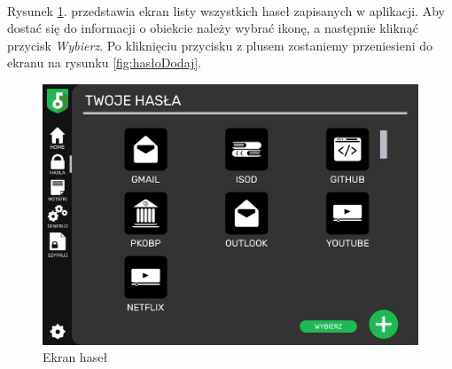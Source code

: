 \documentclass[a4paper]{article}
\begin{document}
\paragraph{}Rysunek \ref{fig:hasła}. przedstawia ekran listy wszystkich haseł zapisanych w aplikacji. Aby dostać się do informacji o obiekcie należy wybrać ikonę, a następnie kliknąć przycisk \textit{Wybierz}. Po kliknięciu przycisku z plusem zostaniemy przeniesieni do ekranu na rysunku \ref{fig:hasłoDodaj}.
\begin{figure}[H]
    \centering
    \includegraphics[width=1\textwidth]{img/ekran_hasel.png}
    \caption{Ekran haseł}
    \label{fig:hasła}
\end{figure}

\newpage
\end{document}
